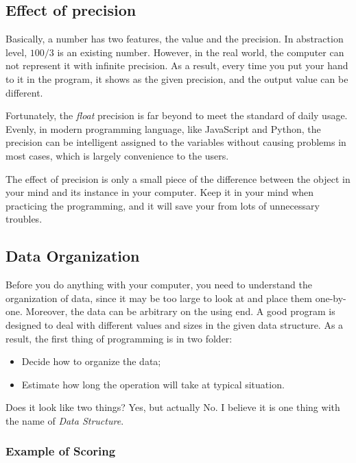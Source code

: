 \subsection{Effect of precision}

Basically, a number has two features, the value and the precision.
In abstraction level, $100/3$ is an existing number.
However, in the real world, the computer can not represent it with infinite precision.
As a result, every time you put your hand to it in the program,
it shows as the given precision, and the output value can be different.



Fortunately, the \emph{float} precision is far beyond to meet the standard of daily usage.
Evenly, in modern programming language, like JavaScript and Python,
the precision can be intelligent assigned to the variables without causing problems in most cases,
which is largely convenience to the users.

The effect of precision is only a small piece of the difference between the object in your mind and its instance in your computer.
Keep it in your mind when practicing the programming, and it will save your from lots of unnecessary troubles.

\subsection{Data Organization}

Before you do anything with your computer,
you need to understand the organization of data,
since it may be too large to look at and place them one-by-one.
Moreover, the data can be arbitrary on the using end.
A good program is designed to deal with different values and sizes in the given data structure.
As a result, the first thing of programming is in two folder:
\begin{itemize}
    \item Decide how to organize the data;
    \item Estimate how long the operation will take at typical situation.
\end{itemize}
Does it look like two things?
Yes, but actually No.
I believe it is one thing with the name of \emph{Data Structure}.

\subsubsection{Example of Scoring}

